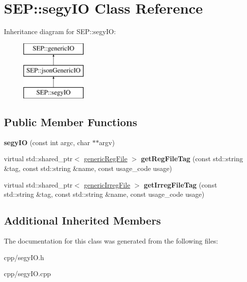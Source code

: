 \hypertarget{class_s_e_p_1_1segy_i_o}{}\section{S\+EP\+:\+:segy\+IO Class Reference}
\label{class_s_e_p_1_1segy_i_o}
Inheritance diagram for S\+EP\+:\+:segy\+IO\+:\begin{figure}[H]
\begin{center}
\leavevmode
\includegraphics[height=3.000000cm]{class_s_e_p_1_1segy_i_o}
\end{center}
\end{figure}
\subsection*{Public Member Functions}
\begin{DoxyCompactItemize}
\item 
\mbox{\label{class_s_e_p_1_1segy_i_o_a331b188d6c9401f08bc9389ee9d3a7eb}} 
{\bfseries segy\+IO} (const int argc, char $\ast$$\ast$argv)
\item 
\mbox{\label{class_s_e_p_1_1segy_i_o_aebc108183eab220020b537d4ff93f26c}} 
virtual std\+::shared\+\_\+ptr$<$ \hyperlink{class_s_e_p_1_1generic_reg_file}{generic\+Reg\+File} $>$ {\bfseries get\+Reg\+File\+Tag} (const std\+::string \&tag, const std\+::string \&name, const usage\+\_\+code usage)
\item 
\mbox{\label{class_s_e_p_1_1segy_i_o_a54dcb43f82a4abd3baf62f7484559a96}} 
virtual std\+::shared\+\_\+ptr$<$ \hyperlink{class_s_e_p_1_1generic_irreg_file}{generic\+Irreg\+File} $>$ {\bfseries get\+Irreg\+File\+Tag} (const std\+::string \&tag, const std\+::string \&name, const usage\+\_\+code usage)
\end{DoxyCompactItemize}
\subsection*{Additional Inherited Members}


The documentation for this class was generated from the following files\+:\begin{DoxyCompactItemize}
\item 
cpp/segy\+I\+O.\+h\item 
cpp/segy\+I\+O.\+cpp\end{DoxyCompactItemize}
